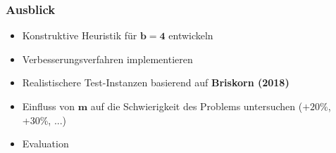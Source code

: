 \documentclass{beamer}
\begin{document}
\begin{frame}
\frametitle{Ausblick}
\begin{itemize}
  \item Konstruktive Heuristik für $\boldsymbol{b = 4}$ entwickeln
  \item Verbesserungsverfahren implementieren
  \item Realistischere Test-Instanzen basierend auf \textbf{Briskorn (2018)}
  \item Einfluss von $\boldsymbol{m}$ auf die Schwierigkeit des Problems untersuchen ($+20\%$, +30\%, ...)
  \item Evaluation
\end{itemize}
\end{frame}



\end{document}
